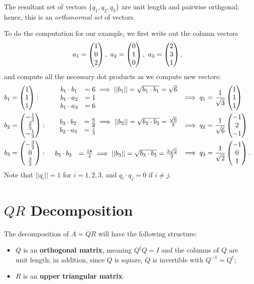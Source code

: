 \documentclass[10pt]{article}
\begin{document}
The resultant set of vectors $\{q_1, q_2, q_3\}$ are unit length and pairwise orthgonal; hence, this is an \emph{orthonormal set} of vectors.

To do the computation for our example, we first write out the column vectors 
\[ a_1 = \begin{pmatrix} 1 \\ 0 \\ 2 \end{pmatrix}, \,\, a_2 = \begin{pmatrix} 0 \\ 1 \\ 0 \end{pmatrix}, \,\, a_3 = \begin{pmatrix} 2 \\ 3 \\ 1 \end{pmatrix}, \]
and compute all the necessary dot products as we compute new vectors: 
\begin{align*}
b_1 & = \begin{pmatrix} 1 \\ 1 \\ 1 \end{pmatrix}:  & \begin{array}{ll} 
b_1 \cdot b_1 & = 6 \implies ||b_1|| = \sqrt{b_1 \cdot b_1} = \sqrt{6} \\
b_1 \cdot a_2 & = 1 \\
b_1 \cdot a_3 & = 6 
\end{array} & \implies q_1 = \frac{1}{\sqrt{3}}\begin{pmatrix} 1 \\ 1 \\ 1 \end{pmatrix} \\
b_2 & = \begin{pmatrix} -\frac{1}{3} \\ \frac{2}{3} \\ -\frac{1}{3} \end{pmatrix}: &  \begin{array}{ll} 
b_2 \cdot b_2 & = \frac{6}{9} \implies ||b_2|| = \sqrt{b_2 \cdot b_2} = \frac{\sqrt{6}}{3} \\
b_2 \cdot a_3 & = \frac{7}{3}
\end{array} & \implies q_2 = \frac{1}{\sqrt{6}}\begin{pmatrix} -1 \\ 2 \\ -1 \end{pmatrix} \\
b_3 & = \begin{pmatrix} -\frac{3}{2} \\ 0 \\ \frac{3}{2} \end{pmatrix}: &  \begin{array}{ll} 
b_3 \cdot b_3 & = \frac{18}{4} \implies ||b_3|| = \sqrt{b_3 \cdot b_3} = \frac{3\sqrt{2}}{2} 
\end{array} & \implies q_3 = \frac{1}{\sqrt{2}}\begin{pmatrix} -1 \\ 0 \\ 1 \end{pmatrix}.
\end{align*}
Note that $||q_i|| = 1$ for $i=1,2,3$, and $q_i \cdot q_j = 0$ if $i \neq j$. 


\section{$QR$ Decomposition}

The decomposition of $A = QR$ will have the following structure: 
\begin{itemize}
\item $Q$ is an \textbf{orthogonal matrix}, meaning $Q^t Q = I$ and the columns of $Q$ are unit length; in addition, since $Q$ is square, $Q$ is invertible with $Q^{-1} = Q^t$; 
\item $R$ is an \textbf{upper triangular matrix}.
\end{itemize}

\vspace{5mm}
\end{document}

